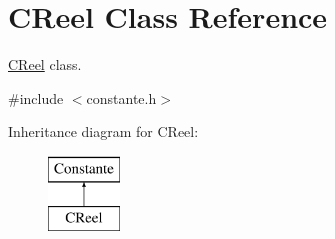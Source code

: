 \hypertarget{class_c_reel}{\section{C\-Reel Class Reference}
\label{class_c_reel}
}


\hyperlink{class_c_reel}{C\-Reel} class.  




{\ttfamily \#include $<$constante.\-h$>$}

Inheritance diagram for C\-Reel\-:\begin{figure}[H]
\begin{center}
\leavevmode
\includegraphics[height=2.000000cm]{class_c_reel}
\end{center}
\end{figure}
